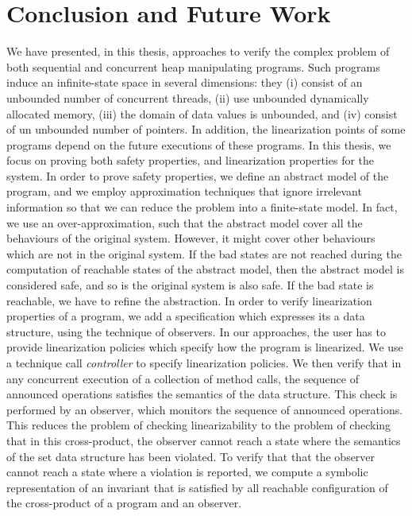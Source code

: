 \chapter{Conclusion and Future Work}
\label{chapter:conclusion}
\label{chapter:future:work}
We have presented, in this thesis, approaches to verify the complex problem of
both sequential and concurrent heap manipulating programs.%
Such programs induce an infinite-state space in several dimensions:
they %
(i) consist of an unbounded number of concurrent threads, %
(ii) use unbounded dynamically allocated memory, %
(iii) the domain of data values is unbounded, and %
(iv) consist of un unbounded number of pointers. In addition, the linearization points of some programs depend on the future executions of these programs. In this thesis, we focus on proving both safety properties, and linearization properties for the system. In order to prove safety properties, we define an abstract model of the program, and we employ approximation techniques that ignore irrelevant information so that we can reduce the problem
into a finite-state model. In fact, we use an over-approximation, such that the abstract model
cover all the behaviours of the original system. However, it might cover other behaviours which are not in the original system. If the bad states are not reached during the computation of reachable states of the abstract model, then the abstract model is considered safe, and so is the original system is also safe. If the bad state is reachable, we have to refine the abstraction. In order to verify linearization properties of a program, we add a specification which expresses its a data structure, using the technique of observers. In our approaches, the user has to provide linearization policies which specify how the program is linearized. We use a technique call  \emph{controller} to specify linearization policies. We then verify that in any concurrent execution of a collection of method calls, the sequence of announced operations satisfies the semantics of the data structure. This check is performed by an observer, which monitors the sequence of announced operations. This reduces the problem of checking linearizability to the problem of checking that in this cross-product, the observer cannot reach a state where the semantics of the set data structure has been violated. To verify that that the observer cannot reach a state where a violation is reported, we compute a symbolic representation of an invariant that is satisfied by all reachable configuration of the cross-product of a program and an observer.%


